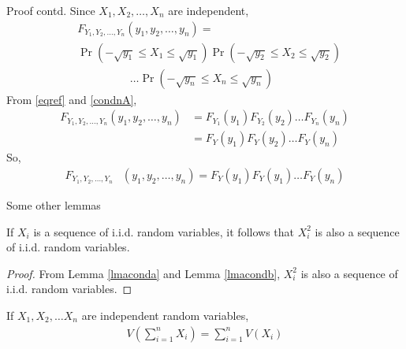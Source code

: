 \documentclass{beamer}
\providecommand{\pr}[1]{\ensuremath{\Pr\left(#1\right)}}
\begin{document}
\begin{frame}{}
\begin{block}{Proof contd.}
   Since $X_1,X_2,\ldots,X_n$ are independent,
    \begin{align}
        &F_{Y_1,Y_2,\dots,Y_n}(y_1,y_2,\dots,y_n)= \nonumber\\
        &\pr{-\sqrt{y_1} \leq X_1 \leq \sqrt{y_1}} \pr{-\sqrt{y_2} \leq X_2 \leq \sqrt{y_2}} \nonumber\\
        &\hspace{2cm} \dots \pr{-\sqrt{y_n} \leq X_n \leq \sqrt{y_n}}
    \end{align}
    From \eqref{eqref} and \eqref{condnA},
    \begin{align}
        F_{Y_1,Y_2,\dots,Y_n}(y_1,y_2,\dots,y_n)&=F_{Y_1}(y_1) F_{Y_2}(y_2)\dots F_{Y_n}(y_n)\\
        &=F_Y(y_1) F_Y(y_2) \dots F_Y(y_n)
    \end{align}
    So,
    \begin{align} \label{condnB}
        F_{Y_1,Y_2,\dots,Y_n}&(y_1,y_2,\dots,y_n)=F_Y(y_1)F_Y(y_1)\dots F_Y(y_n)
    \end{align}
\end{block}
\end{frame}
\begin{frame}{Some other lemmas}
\begin{lemma} \label{xi2lma}
If ${X_i}$ is a sequence of i.i.d. random variables, it follows that $X_i^2$ is also a sequence of i.i.d. random variables.
\end{lemma}
\begin{proof}
    From Lemma \ref{lmaconda} and Lemma \ref{lmacondb}, $X_i^2$ is also a sequence of i.i.d. random variables.
\end{proof}

\begin{lemma} \label{varsum}
    If $X_1, X_2, \ldots X_n$ are independent random variables,
    \begin{align}
        V (\sum_{i=1}^n X_i) = \sum_{i=1}^n V(X_i)
    \end{align}
\end{lemma}
\end{frame}
\end{document}
